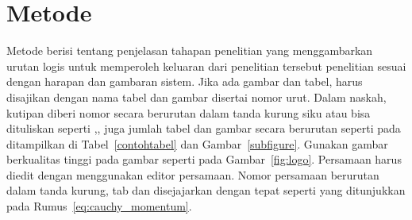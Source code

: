 \documentclass[
 manuscript=article,  %
  layout=publish, 
  year=2024, 
  month= Februari, %
  volume=8,
  number=1 
]{JIKO}
\begin{document}
\section{Metode}


Metode berisi tentang penjelasan tahapan penelitian yang menggambarkan urutan logis untuk memperoleh keluaran dari penelitian tersebut
penelitian sesuai dengan harapan dan gambaran sistem. Jika ada gambar dan tabel,  harus disajikan
dengan nama tabel dan gambar disertai nomor urut. Dalam naskah, kutipan diberi nomor secara berurutan
dalam tanda kurung siku \cite{Lutfiyana2017,Pramana2013,Vygotsky1999} atau bisa dituliskan seperti \cite{Lutfiyana2017},\cite{Pramana2013},\cite{Vygotsky1999} juga jumlah tabel dan gambar secara berurutan seperti pada
ditampilkan di Tabel~\ref{contohtabel} dan Gambar~\ref{subfigure}.
Gunakan gambar berkualitas tinggi pada gambar seperti pada Gambar~\ref{fig:logo}. Persamaan harus diedit dengan
menggunakan editor persamaan. Nomor persamaan berurutan dalam tanda kurung, tab dan disejajarkan dengan
tepat seperti yang ditunjukkan pada Rumus~\eqref{eq:cauchy_momentum}\cite{Setyowati2020}.
\end{document}
